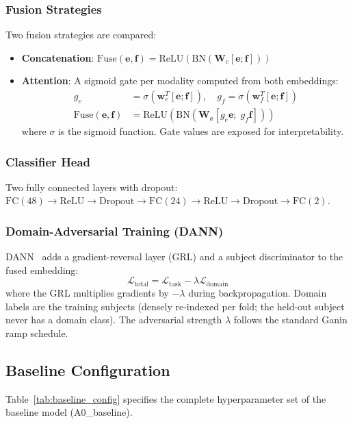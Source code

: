 \documentclass[conference]{IEEEtran}
\begin{document}
\subsubsection{Fusion Strategies}
Two fusion strategies are compared:
\begin{itemize}
    \item \textbf{Concatenation}: $\mathrm{Fuse}(\mathbf{e}, \mathbf{f}) = \mathrm{ReLU}(\mathrm{BN}(\mathbf{W}_c [\mathbf{e}; \mathbf{f}]))$
    \item \textbf{Attention}: A sigmoid gate per modality computed from both embeddings:
    \begin{align}
        g_e &= \sigma(\mathbf{w}_e^T [\mathbf{e}; \mathbf{f}]), \quad
        g_f = \sigma(\mathbf{w}_f^T [\mathbf{e}; \mathbf{f}]) \\
        \mathrm{Fuse}(\mathbf{e}, \mathbf{f}) &= \mathrm{ReLU}(\mathrm{BN}(\mathbf{W}_a [g_e \mathbf{e};\; g_f \mathbf{f}]))
    \end{align}
    where $\sigma$ is the sigmoid function. Gate values are exposed for interpretability.
\end{itemize}

\subsubsection{Classifier Head}
Two fully connected layers with dropout: $\mathrm{FC}(48) \to \mathrm{ReLU} \to \mathrm{Dropout} \to \mathrm{FC}(24) \to \mathrm{ReLU} \to \mathrm{Dropout} \to \mathrm{FC}(2)$.

\subsubsection{Domain-Adversarial Training (DANN)}
DANN~\cite{ganin2016domain} adds a gradient-reversal layer (GRL) and a subject discriminator to the fused embedding:
\begin{equation}
    \mathcal{L}_{\mathrm{total}} = \mathcal{L}_{\mathrm{task}} - \lambda \mathcal{L}_{\mathrm{domain}}
\end{equation}
where the GRL multiplies gradients by $-\lambda$ during backpropagation. Domain labels are the training subjects (densely re-indexed per fold; the held-out subject never has a domain class). The adversarial strength $\lambda$ follows the standard Ganin ramp schedule.

\subsection{Baseline Configuration}
Table~\ref{tab:baseline_config} specifies the complete hyperparameter set of the baseline model (A0\_baseline).
\end{document}
